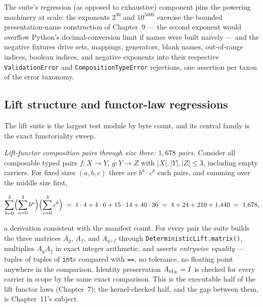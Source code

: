 The suite's regression (as opposed to exhaustive) component pins the
powering machinery at scale: the exponents $2^{30}$ and $10^{5000}$
exercise the bounded presentation-name construction of Chapter~9 ---
the second exponent would overflow Python's decimal-conversion limit if
names were built naively --- and the negative fixtures drive sets,
mappings, generators, blank names, out-of-range indices, boolean indices,
and negative exponents into their respective \texttt{ValidationError} and
\texttt{CompositionTypeError} rejections, one assertion per taxon of the
error taxonomy.

\subsection{Lift structure and functor-law regressions}\label{ch10:sec:lift-suite}

The lift suite is the largest test module by byte count, and its central
family is the exact functoriality sweep.

\emph{Lift-functor composition pairs through size three: $1{,}678$
pairs.} Consider all composable typed pairs $f : X \to Y$, $g : Y \to Z$
with $|X|, |Y|, |Z| \le 3$, including empty carriers. For fixed sizes
$(a, b, c)$ there are $b^a \cdot c^b$ such pairs, and summing over the
middle size first,

\[
\sum_{b=0}^{3}\Bigl(\sum_{a=0}^{3} b^{a}\Bigr)\Bigl(\sum_{c=0}^{3} c^{b}\Bigr)
\;=\; 1\cdot 4 + 4\cdot 6 + 15\cdot 14 + 40\cdot 36
\;=\; 4 + 24 + 210 + 1{,}440 \;=\; 1{,}678 ,
\]

a derivation consistent with the manifest count. For every pair the suite
builds the three matrices $A_g$, $A_f$, and $A_{g \circ f}$ through
\texttt{DeterministicLift.matrix()}, multiplies $A_g A_f$ in exact integer
arithmetic, and asserts \emph{entrywise equality} --- tuples of tuples of
\texttt{int}s compared with \texttt{==}, no tolerance, no floating point
anywhere in the comparison. Identity preservation $A_{\mathrm{id}_X} = I$ is
checked for every carrier in scope by the same exact comparison. This is
the executable half of the lift functor laws (Chapter~7); the
kernel-checked half, and the gap between them, is Chapter~11's subject.

